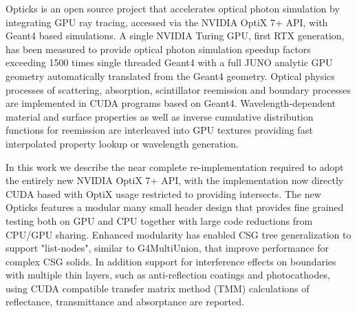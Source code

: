 Opticks is an open source project that accelerates optical photon simulation  
by integrating GPU ray tracing, accessed via the NVIDIA OptiX 7+ API, with 
Geant4 based simulations. 
A single NVIDIA Turing GPU, first RTX generation, has been measured to provide optical 
photon simulation speedup factors exceeding 1500 times single threaded Geant4 
with a full JUNO analytic GPU geometry automatically translated from the Geant4 geometry.
%
Optical physics processes of scattering, absorption, scintillator reemission and 
boundary processes are implemented in CUDA programs based on Geant4.
Wavelength-dependent material and surface properties as well as  
inverse cumulative distribution functions for reemission are interleaved into 
GPU textures providing fast interpolated property lookup or wavelength generation.
%

In this work we describe the near complete re-implementation required to adopt 
the entirely new NVIDIA OptiX 7+ API, with the implementation now directly CUDA 
based with OptiX usage restricted to providing intersects.  
The new Opticks features a modular many small header
design that provides fine grained testing both on GPU and CPU 
together with large code reductions from CPU/GPU sharing.  
Enhanced modularity has enabled CSG tree generalization to support "list-nodes", 
similar to G4MultiUnion, that improve performance for complex CSG solids.  
In addition support for interference effects on boundaries with multiple thin layers,
such as anti-reflection coatings and photocathodes, using CUDA compatible
transfer matrix method (TMM) calculations of reflectance, transmittance and
absorptance are reported.
